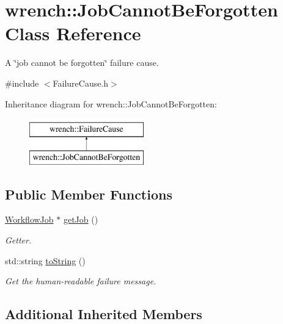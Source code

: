 \hypertarget{classwrench_1_1_job_cannot_be_forgotten}{}\section{wrench\+:\+:Job\+Cannot\+Be\+Forgotten Class Reference}
\label{classwrench_1_1_job_cannot_be_forgotten}


A \char`\"{}job cannot be forgotten\char`\"{} failure cause.  




{\ttfamily \#include $<$Failure\+Cause.\+h$>$}

Inheritance diagram for wrench\+:\+:Job\+Cannot\+Be\+Forgotten\+:\begin{figure}[H]
\begin{center}
\leavevmode
\includegraphics[height=2.000000cm]{classwrench_1_1_job_cannot_be_forgotten}
\end{center}
\end{figure}
\subsection*{Public Member Functions}
\begin{DoxyCompactItemize}
\item 
\hyperlink{classwrench_1_1_workflow_job}{Workflow\+Job} $\ast$ \hyperlink{classwrench_1_1_job_cannot_be_forgotten_ae21aa5adc48ff0998d9fefc7f2c4c9f9}{get\+Job} ()
\begin{DoxyCompactList}\small\item\em Getter. \end{DoxyCompactList}\item 
std\+::string \hyperlink{classwrench_1_1_job_cannot_be_forgotten_abbfbece144c738c9948bf8f01d6bbd53}{to\+String} ()
\begin{DoxyCompactList}\small\item\em Get the human-\/readable failure message. \end{DoxyCompactList}\end{DoxyCompactItemize}
\subsection*{Additional Inherited Members}


